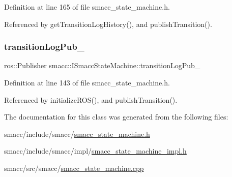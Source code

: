 Definition at line 165 of file smacc\+\_\+state\+\_\+machine.\+h.



Referenced by get\+Transition\+Log\+History(), and publish\+Transition().

\mbox{\label{classsmacc_1_1ISmaccStateMachine_acc42eb050325c1edc77d81675fb1286a}} 
\subsubsection{\texorpdfstring{transition\+Log\+Pub\+\_\+}{transitionLogPub\_}}
{\footnotesize\ttfamily ros\+::\+Publisher smacc\+::\+I\+Smacc\+State\+Machine\+::transition\+Log\+Pub\+\_\+\hspace{0.3cm}{\ttfamily [protected]}}



Definition at line 143 of file smacc\+\_\+state\+\_\+machine.\+h.



Referenced by initialize\+R\+O\+S(), and publish\+Transition().



The documentation for this class was generated from the following files\+:\begin{DoxyCompactItemize}
\item 
smacc/include/smacc/\hyperlink{smacc__state__machine_8h}{smacc\+\_\+state\+\_\+machine.\+h}\item 
smacc/include/smacc/impl/\hyperlink{smacc__state__machine__impl_8h}{smacc\+\_\+state\+\_\+machine\+\_\+impl.\+h}\item 
smacc/src/smacc/\hyperlink{smacc__state__machine_8cpp}{smacc\+\_\+state\+\_\+machine.\+cpp}\end{DoxyCompactItemize}
